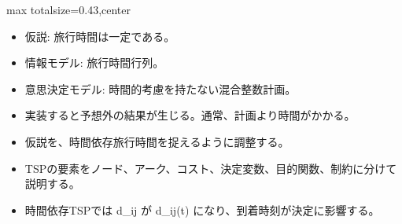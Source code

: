 \clearpage
{}
\begin{minipage}[t]{0.405\textwidth}
\begin{adjustbox}{max totalsize={\textwidth}{0.43\textheight},center}
\begin{minipage}{\textwidth}\scriptsize
{}\begin{itemize}
\item 仮説: 旅行時間は一定である。
\item 情報モデル: 旅行時間行列。
\item 意思決定モデル: 時間的考慮を持たない混合整数計画。
\item 実装すると予想外の結果が生じる。通常、計画より時間がかかる。
\item 仮説を、時間依存旅行時間を捉えるように調整する。
\end{itemize}\begin{itemize}
\item TSPの要素をノード、アーク、コスト、決定変数、目的関数、制約に分けて説明する。
\item 時間依存TSPでは d\_ij が d\_ij(t) になり、到着時刻が決定に影響する。
\end{itemize}
\end{minipage}
\end{adjustbox}
\end{minipage}\hfill
